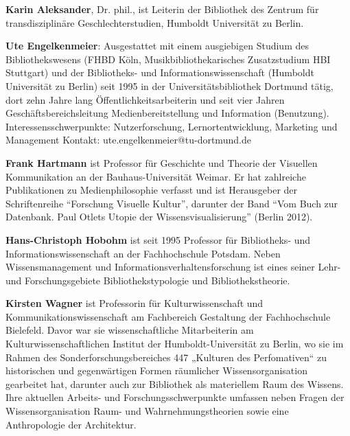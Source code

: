 \documentclass[10.5pt,a5paper,twoside]{memoir}
\begin{document}
\noindent \textbf{Karin Aleksander}, Dr. phil., ist Leiterin der Bibliothek des Zentrum für transdisziplinäre Geschlechterstudien, Humboldt Universität zu Berlin.

\vspace{5mm}

\noindent \textbf{Ute Engelkenmeier}: Ausgestattet mit einem ausgiebigen Studium des
Bibliothekswesens (FHBD Köln, Musikbibliothekarisches Zusatzstudium HBI
Stuttgart) und der Bibliotheks- und Informationswissenschaft (Humboldt
Universität zu Berlin) seit 1995 in der Universitätsbibliothek Dortmund
tätig, dort zehn Jahre lang Öffentlichkeitsarbeiterin und seit vier
Jahren Geschäftsbereichsleitung Medienbereitstellung und Information
(Benutzung).
Interessensschwerpunkte: Nutzerforschung, Lernortentwicklung, Marketing
und Management
Kontakt: ute.engelkenmeier@tu-dortmund.de

\vspace{5mm}

\noindent \textbf{Frank Hartmann} ist Professor für Geschichte und Theorie der Visuellen Kommunikation an der Bauhaus-Universität Weimar. Er hat zahlreiche Publikationen zu Medienphilosophie verfasst und ist Herausgeber der Schriftenreihe \enquote{Forschung Visuelle Kultur}, darunter der Band \enquote{Vom Buch zur Datenbank. Paul Otlets Utopie der Wissensvisualisierung} (Berlin 2012).

\vspace{5mm}

\noindent \textbf{Hans-Christoph Hobohm} ist seit 1995 Professor für Biblio\-theks- und Informationswissenschaft an der Fachhochschule Potsdam. Neben Wissensmanagement und Informationsverhaltensforschung ist eines seiner Lehr- und Forschungsgebiete Bibliothekstypologie und Bibliothekstheorie.

\vspace{5mm}

\noindent \textbf{Kirsten Wagner} ist Professorin für Kulturwissenschaft und
Kommunikationswissenschaft am Fachbereich Gestaltung der Fachhochschule
Bielefeld. Davor war sie wissenschaftliche Mitarbeiterin am
Kulturwissenschaftlichen Institut der Humboldt-Universität zu Berlin, wo
sie im Rahmen des Sonderforschungsbereiches 447 „Kulturen des
Perfomativen“ zu historischen und gegenwärtigen Formen räumlicher
Wissensorganisation gearbeitet hat, darunter auch zur Bibliothek als
materiellem Raum des Wissens. Ihre aktuellen Arbeits- und
Forschungsschwerpunkte umfassen neben Fragen der Wissensorganisation
Raum- und Wahrnehmungstheorien sowie eine Anthropologie der Architektur.

\cleartoverso

\cleartorecto
\end{document}
